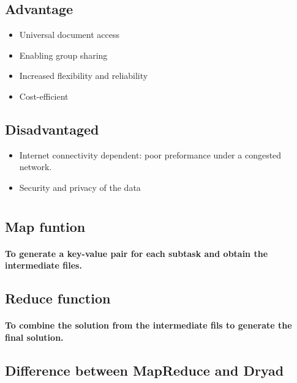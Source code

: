 \documentclass{article}
\begin{document}
        \subsection{Advantage}
            \begin{itemize}
                \item Universal document access
                \item Enabling group sharing
                \item Increased flexibility and reliability
                \item Cost-efficient
            \end{itemize}
        \subsection{Disadvantaged}
            \begin{itemize}
                \item Internet connectivity dependent: poor preformance under a congested network.
                \item Security and privacy of the data
            \end{itemize}
    \section{}
        \subsection{Map funtion}
            \paragraph{
                To generate a key-value pair for each subtask and obtain the intermediate files.
            }
        \subsection{Reduce function}
            \paragraph{
                To combine the solution from the intermediate fils to generate the final solution.
            }
        \subsection{Difference between MapReduce and Dryad}
\end{document}
